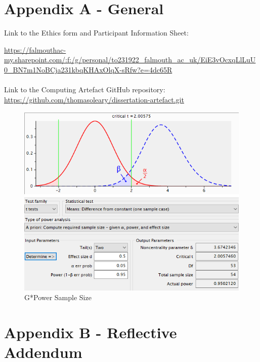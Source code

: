 \section*{Appendix A - General} \label{append:a}
Link to the Ethics form and Participant Information Sheet:

\url{https://falmouthac-my.sharepoint.com/:f:/g/personal/to231922_falmouth_ac_uk/EiE3vOcxqLlLuU0_BN7m1NoBCja231kbqKHAxOlqX-sRfw?e=4dc65R}
\\
\\
Link to the Computing Artefact GitHub repository: 
\url{https://github.com/thomasoleary/dissertation-artefact.git}
\begin{figure}[ht]
    \includegraphics[width=\columnwidth]{./Images/gpower.png}
    \centering
    \caption{G*Power Sample Size}
    \label{gpower}
\end{figure}

\newpage
\section*{Appendix B - Reflective Addendum} \label{append:b}
